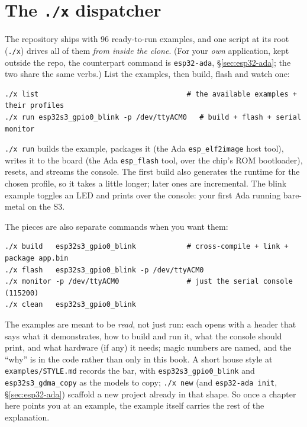 \section{The \texttt{./x} dispatcher}

The repository ships with 96 ready-to-run examples, and one script at
its root (\texttt{./x}) drives all of them \emph{from inside the clone}. (For
your \emph{own} application, kept outside the repo, the counterpart command is
\texttt{esp32-ada}, \S\ref{sec:esp32-ada}; the two share the same verbs.) List the
examples, then build, flash and watch one:

\begin{lstlisting}[style=sh]
./x list                                   # the available examples + their profiles
./x run esp32s3_gpio0_blink -p /dev/ttyACM0   # build + flash + serial monitor
\end{lstlisting}

\texttt{./x run} builds the example, packages it (the Ada \texttt{esp\_elf2image}
host tool), writes it to the board (the Ada \texttt{esp\_flash} tool, over the
chip's ROM bootloader), resets, and streams the console. The first build also
generates the runtime for the chosen profile, so it takes a little longer; later
ones are incremental. The blink example toggles an LED and prints over the
console: your first Ada running bare-metal on the S3.

The pieces are also separate commands when you want them:

\begin{lstlisting}[style=sh]
./x build   esp32s3_gpio0_blink            # cross-compile + link + package app.bin
./x flash   esp32s3_gpio0_blink -p /dev/ttyACM0
./x monitor -p /dev/ttyACM0                # just the serial console (115200)
./x clean   esp32s3_gpio0_blink
\end{lstlisting}

The examples are meant to be \emph{read}, not just run: each opens with a header
that says what it demonstrates, how to build and run it, what the console should
print, and what hardware (if any) it needs; magic numbers are named, and the
``why'' is in the code rather than only in this book. A short house style at
\texttt{examples/STYLE.md} records the bar, with \texttt{esp32s3\_gpio0\_blink}
and \texttt{esp32s3\_gdma\_copy} as the models to copy; \texttt{./x new} (and
\texttt{esp32-ada init}, \S\ref{sec:esp32-ada}) scaffold a new project already in
that shape. So once a chapter here points you at an example, the example itself
carries the rest of the explanation.

